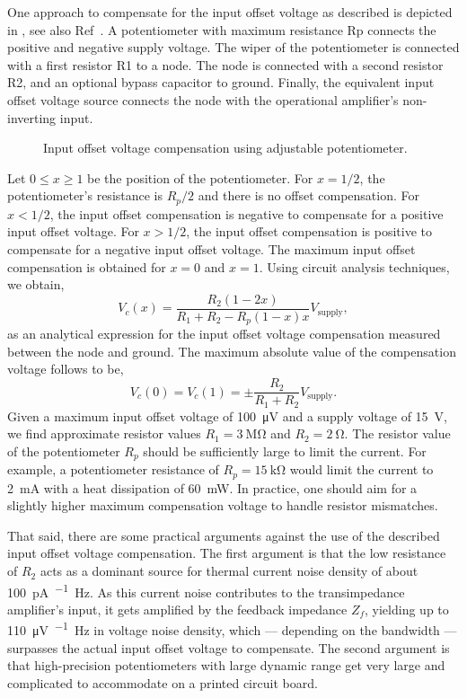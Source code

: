 One approach to compensate for the input offset voltage as described is depicted in , see also Ref~\cite[p.~54]{Jung05}.
A potentiometer with maximum resistance Rp connects the positive and negative supply voltage.
The wiper of the potentiometer is connected with a first resistor R1 to a node.
The node is connected with a second resistor R2, and an optional bypass capacitor to ground.
Finally, the equivalent input offset voltage source connects the node with the operational amplifier's non-inverting input.
\begin{figure}[H]
	\centering
	
	\caption{Input offset voltage compensation using adjustable potentiometer.}\label{fig:input_offset_voltage_compensation}
\end{figure}
Let $0\leq x\geq1$ be the position of the potentiometer.
For $x=1/2$, the potentiometer's resistance is $R_p/2$ and there is no offset compensation.
For $x<1/2$, the input offset compensation is negative to compensate for a positive input offset voltage.
For $x>1/2$, the input offset compensation is positive to compensate for a negative input offset voltage.
The maximum input offset compensation is obtained for $x=0$ and $x=1$.
Using circuit analysis techniques, we obtain,
\begin{equation}
	V_c(x)=\frac{R_2(1-2x)}{R_1+R_2-R_p(1-x)x}V_\text{supply},
\end{equation}
as an analytical expression for the input offset voltage compensation measured between the node and ground.
The maximum absolute value of the compensation voltage follows to be,
\begin{equation}
	V_c(0)=V_c(1)=\pm\frac{R_2}{R_1+R_2}V_\text{supply}.
\end{equation}
Given a maximum input offset voltage of \SI{100}{\micro\volt} and a supply voltage of \SI{15}{\volt}, we find approximate resistor values $R_1=\SI{3}{\mega\ohm}$ and $R_2=\SI{2}{\ohm}$.
The resistor value of the potentiometer $R_p$ should be sufficiently large to limit the current.
For example, a potentiometer resistance of $R_p=\SI{15}{\kilo\ohm}$ would limit the current to \SI{2}{\milli\ampere} with a heat dissipation of \SI{60}{\milli\watt}.
In practice, one should aim for a slightly higher maximum compensation voltage to handle resistor mismatches.

That said, there are some practical arguments against the use of the described input offset voltage compensation.
The first argument is that the low resistance of $R_2$ acts as a dominant source for thermal current noise density of about \SI{100}{\pico\ampere\per\sqrt\hertz}.
As this current noise contributes to the transimpedance amplifier's input, it gets amplified by the feedback impedance $Z_f$, yielding up to \SI{110}{\micro\volt\per\sqrt\hertz} in voltage noise density, which --- depending on the bandwidth --- surpasses the actual input offset voltage to compensate.
The second argument is that high-precision potentiometers with large dynamic range get very large and complicated to accommodate on a printed circuit board.

